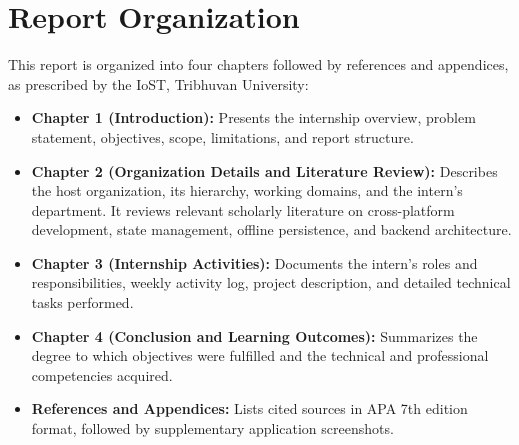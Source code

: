 \section{Report Organization}
This report is organized into four chapters followed by references and appendices, as prescribed by the IoST, Tribhuvan University:
\begin{itemize}
    \item \textbf{Chapter 1 (Introduction):} Presents the internship overview, problem statement, objectives, scope, limitations, and report structure.
    \item \textbf{Chapter 2 (Organization Details and Literature Review):} Describes the host organization, its hierarchy, working domains, and the intern's department. It reviews relevant scholarly literature on cross-platform development, state management, offline persistence, and backend architecture.
    \item \textbf{Chapter 3 (Internship Activities):} Documents the intern's roles and responsibilities, weekly activity log, project description, and detailed technical tasks performed.
    \item \textbf{Chapter 4 (Conclusion and Learning Outcomes):} Summarizes the degree to which objectives were fulfilled and the technical and professional competencies acquired.
    \item \textbf{References and Appendices:} Lists cited sources in APA 7th edition format, followed by supplementary application screenshots.
\end{itemize}